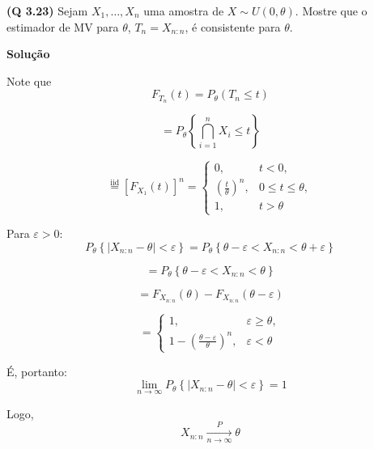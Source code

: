 \textbf{(Q 3.23)} Sejam $X_1, \ldots, X_n$ uma amostra de $X \sim U(0, \theta)$. Mostre que o estimador de MV para $\theta$, $T_n = X_{n:n}$, é consistente para $\theta$.

\textbf{Solução}

Note que
\begin{equation}
F_{T_n}(t) = P_\theta(T_n \leq t)
\end{equation}

\begin{equation}
= P_\theta \left\{ \bigcap_{i=1}^n X_i \leq t \right\}
\end{equation}

\begin{equation}
\overset{\text{iid}}{=} \left[ F_{X_1}(t) \right]^n = 
\begin{cases}
0, & t < 0, \\
\left( \frac{t}{\theta} \right)^n, & 0 \leq t \leq \theta, \\
1, & t > \theta
\end{cases}
\end{equation}

Para $\varepsilon > 0$:
\begin{equation}
P_\theta \left\{ |X_{n:n} - \theta| < \varepsilon \right\} 
= P_\theta \left\{ \theta - \varepsilon < X_{n:n} < \theta + \varepsilon \right\}
\end{equation}

\begin{equation}
= P_\theta \left\{ \theta - \varepsilon < X_{n:n} < \theta \right\}
\end{equation}

\begin{equation}
= F_{X_{n:n}}(\theta) - F_{X_{n:n}}(\theta - \varepsilon)
\end{equation}

\begin{equation}
= 
\begin{cases}
1, & \varepsilon \geq \theta, \\
1 - \left( \frac{\theta - \varepsilon}{\theta} \right)^n, & \varepsilon < \theta
\end{cases}
\end{equation}

É, portanto:
\begin{equation}
\lim_{n \to \infty} P_\theta \left\{ |X_{n:n} - \theta| < \varepsilon \right\} = 1
\end{equation}

Logo,
\begin{equation}
X_{n:n} \xrightarrow[n \to \infty]{P} \theta
\end{equation}